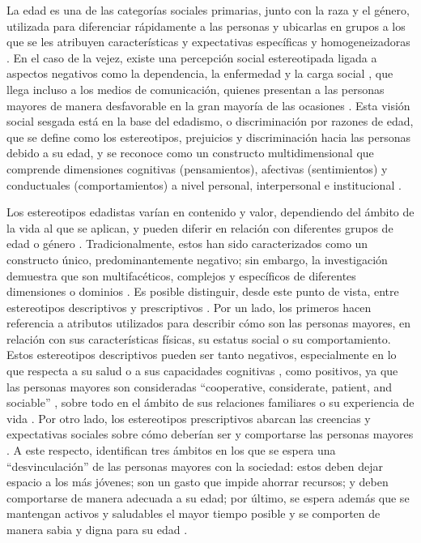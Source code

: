 \documentclass[spanish]{textolivre}
\begin{document}
La edad es una de las categorías sociales primarias, junto con la raza y el género, utilizada para diferenciar rápidamente a las personas y ubicarlas en grupos a los que se les atribuyen características y expectativas específicas y homogeneizadoras \cite{brewer1989}. En el caso de la vejez, existe una percepción social estereotipada ligada a aspectos negativos como la dependencia, la enfermedad y la carga social \cite{ayalon2023, bellingtier2022}, que llega incluso a los medios de comunicación, quienes presentan a las personas mayores de manera desfavorable en la gran mayoría de las ocasiones \cite{bravosegal2020}. Esta visión social sesgada está en la base del edadismo, o discriminación por razones de edad, que se define como los estereotipos, prejuicios y discriminación hacia las personas debido a su edad, y se reconoce como un constructo multidimensional que comprende dimensiones cognitivas (pensamientos), afectivas (sentimientos) y conductuales (comportamientos) a nivel personal, interpersonal e institucional \cite{oms2021}.

Los estereotipos edadistas varían en contenido y valor, dependiendo del ámbito de la vida al que se aplican, y pueden diferir en relación con diferentes grupos de edad o género \cite{depaulacoutoetal2022}. Tradicionalmente, estos han sido caracterizados como un constructo único, predominantemente negativo; sin embargo, la investigación demuestra que son multifacéticos, complejos y específicos de diferentes dimensiones o dominios \cite{kornadt2011}. Es posible distinguir, desde este punto de vista, entre estereotipos descriptivos y prescriptivos \cite{rothermund2024}. Por un lado, los primeros hacen referencia a atributos utilizados para describir cómo son las personas mayores, en relación con sus características físicas, su estatus social o su comportamiento. Estos estereotipos descriptivos pueden ser tanto negativos, especialmente en lo que respecta a su salud \cite{kornadt2016} o a sus capacidades cognitivas \cite{dorgnier2022, levy2022}, como positivos, ya que las personas mayores son consideradas ``cooperative, considerate, patient, and sociable'' \cite[p. e351]{carlson2020}, sobre todo en el ámbito de sus relaciones familiares o su experiencia de vida \cite{kornadt2016}. Por otro lado, los estereotipos prescriptivos abarcan las creencias y expectativas sociales sobre cómo deberían ser y comportarse las personas mayores \cite{rothermund2024}. A este respecto, \textcite[p. 3]{rasset2024} identifican tres ámbitos en los que se espera una ``desvinculación'' de las personas mayores con la sociedad: estos deben dejar espacio a los más jóvenes; son un gasto que impide ahorrar recursos; y deben comportarse de manera adecuada a su edad; por último, se espera además que se mantengan activos y saludables el mayor tiempo posible y se comporten de manera sabia y digna para su edad \cite{depaulacouto2022}.
\end{document}
